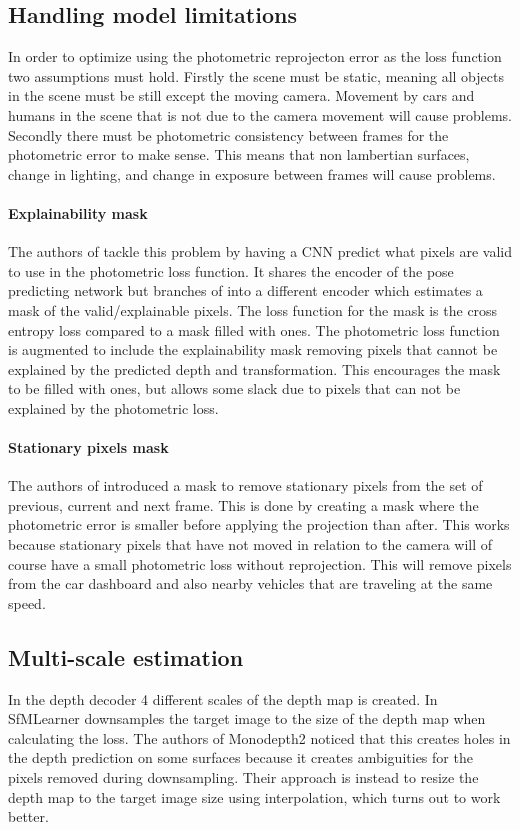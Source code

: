 \subsection{Handling model limitations}
\label{sec:modellimit}

In order to optimize using the photometric reprojecton error as the loss function two assumptions must hold. Firstly the scene must be static, meaning all objects in the scene must be still except the moving camera. Movement by cars and humans in the scene that is not due to the camera movement will cause problems. Secondly there must be photometric consistency between frames for the photometric error to make sense. This means that non lambertian surfaces, change in lighting, and change in exposure between frames will cause problems.

\paragraph{Explainability mask} The authors of \cite{sfmlearner} tackle this problem by having a CNN predict what pixels are valid to use in the photometric loss function. It shares the encoder of the pose predicting network but branches of into a different encoder which estimates a mask of the valid/explainable pixels. The loss function for the mask is the cross entropy loss compared to a mask filled with ones. The photometric loss function is augmented to include the explainability mask removing pixels that cannot be explained by the predicted depth and transformation. This encourages the mask to be filled with ones, but allows some slack due to pixels that can not be explained by the photometric loss.

\paragraph{Stationary pixels mask} The authors of \cite{monodepth2} introduced a mask to remove stationary pixels from the set of previous, current and next frame. This is done by creating a mask where the photometric error is smaller before applying the projection than after. This works because stationary pixels that have not moved in relation to the camera will of course have a small photometric loss without reprojection. This will remove pixels from the car dashboard and also nearby vehicles that are traveling at the same speed.

\subsection{Multi-scale estimation}

In the depth decoder 4 different scales of the depth map is created. In SfMLearner downsamples the target image to the size of the depth map when calculating the loss. The authors of Monodepth2 noticed that this creates holes in the depth prediction on some surfaces because it creates ambiguities for the pixels removed during downsampling. Their approach is instead to resize the depth map to the target image size using interpolation, which turns out to work better.